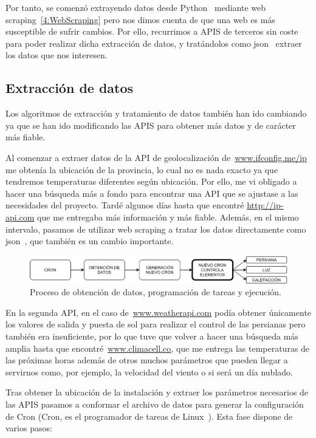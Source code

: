 Por tanto, se comenzó extrayendo datos desde Python~\cite{misc:Python} mediante web scraping~\ref{4:WebScraping} pero nos dimos cuenta de que una web es más susceptible de sufrir cambios. Por ello, recurrimos a APIS de terceros sin coste para poder realizar dicha extracción de datos, y tratándolos como json~\cite{misc:Json} extraer los datos que nos interesen.

\subsection{Extracción de datos}
Los algoritmos de extracción y tratamiento de datos también han ido cambiando ya que se han ido modificando las APIS para obtener más datos y de carácter más fiable.

Al comenzar a extraer datos de la API de geolocalización de~\url{www.ifconfig.me/ip} me obtenía la ubicación de la provincia, lo cual no es nada exacto ya que tendremos temperaturas diferentes según ubicación. Por ello, me vi obligado a hacer una búsqueda más a fondo para encontrar una API que se ajustase a las necesidades del proyecto. Tardé algunos días hasta que encontré \url{http://ip-api.com} que me entregaba más información y más fiable. Además, en el mismo intervalo, pasamos de utilizar web scraping a tratar los datos directamente como json~\cite{misc:Json}, que también es un cambio importante.

\begin{figure}
    \centering
    \includegraphics[width=\textwidth]{img/Cron1.PNG}
    \caption{Proceso de obtención de datos, programación de tareas y ejecución.} \label{Img:Cron1}
\end{figure}

En la segunda API, en el caso de~\url{www.weatherapi.com} podía obtener únicamente los valores de salida y puesta de sol para realizar el control de las persianas pero también era insuficiente, por lo que tuve que volver a hacer una búsqueda más amplia hasta que encontré~\url{www.climacell.co}, que me entrega las temperaturas de las próximas horas además de otros muchos parámetros que pueden llegar a servirnos como, por ejemplo, la velocidad del viento o si será un día nublado.

Tras obtener la ubicación de la instalación y extraer los parámetros necesarios de las APIS pasamos a conformar el archivo de datos para generar la configuración de Cron (Cron, es el programador de tareas de Linux~\cite{misc:Linux}). Esta fase dispone de varios pasos:


